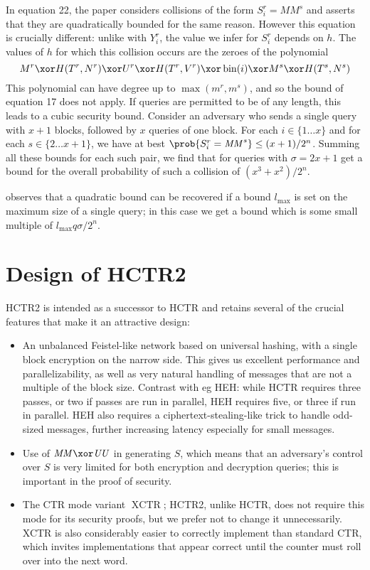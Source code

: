 \documentclass[letterpaper,11pt]{article}
\newcommand*{\MM}{\mathit{MM}}
\newcommand*{\UU}{\mathit{UU}}
\DeclareMathOperator{\fromint}{bin}
\DeclareMathOperator{\XCTR}{XCTR}
\begin{document}
In equation 22, the paper considers collisions of the form 
\(S_i^r = \MM^s\) and asserts that they are
quadratically bounded for the same reason. However this equation
is crucially different: unlike with \(Y_i^r\), the value we
infer for \(S_i^r\) depends on \(h\). The values of \(h\)
for which this collision occurs are
the zeroes of the polynomial
\begin{displaymath}
    M^r \xor H(T^r, N^r)
    \xor U^r \xor H(T^r, V^r) \xor \fromint(i) 
    \xor M^s \xor H(T^s, N^s)        
\end{displaymath}
This polynomial can have degree up to 
\(\max(m^r, m^s)\), and so the bound of
equation 17 does not apply.
If queries are permitted to be of any length,
this leads to a cubic security bound.
Consider an adversary who
sends a single query with \(x+1\) blocks, followed by
\(x\) queries of one block. For each \(i \in \{1\ldots x\}\) and
for each \(s \in \{2 \ldots x + 1\}\), we have at best
\(\prob{S_i^r = \MM^s} \leq (x + 1)/2^n\). Summing
all these bounds for each such pair, we find that
for queries with \(\sigma = 2x + 1\)
get a bound for the overall probability of such a collision of 
\((x^3 + x^2)/2^n\).

\cite{nandimail} observes that a quadratic bound can be recovered
if a bound \(l_\mathrm{max}\) is set on the maximum size of
a single query; in this case we get a bound
which is some small multiple of \(l_\mathrm{max}q\sigma/2^n\).

\section{Design of HCTR2}
HCTR2 is intended as a successor to HCTR and retains several of the
crucial features that make it an attractive design:
\begin{itemize}
    \item An unbalanced Feistel-like network based on universal
    hashing, with a single block encryption on the narrow side.
    This gives us excellent performance and parallelizability,
    as well as very natural handling of messages that are not
    a multiple of the block size. Contrast with eg HEH\cite{heh}:
    while HCTR requires three passes, or two if passes are
    run in parallel, HEH requires five, or three if run in parallel.
    HEH also requires a ciphertext-stealing-like trick to
    handle odd-sized messages, further increasing
    latency especially for small messages.
    \item Use of \(\MM \xor \UU\) in generating \(S\), which means
    that an adversary's control over \(S\) is very limited for both
    encryption and decryption queries; this is important in the
    proof of security.
    \item The CTR mode variant \(\XCTR\); HCTR2, unlike HCTR,
    does not require this mode for its security proofs, 
    but we prefer not to change it unnecessarily.
    XCTR is also considerably easier to correctly
    implement than standard CTR, which invites
    implementations that appear correct
    until the counter must roll over into 
    the next word.
\end{itemize}
\end{document}
